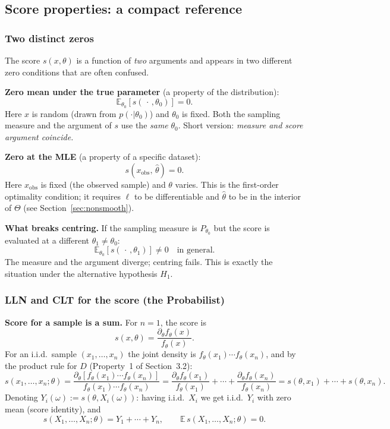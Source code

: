 \documentclass[a4paper,oneside,12pt]{extarticle}
\theoremstyle{plain}
\theoremstyle{definition}
\theoremstyle{remark}
\newcommand*{\E}{\mathbb{E}}
\begin{document}
\subsection{Score properties: a compact reference}
\label{sec:score_reference}

\subsubsection{Two distinct zeros}

The score $s(x,\theta)$ is a function of \emph{two} arguments and
appears in two different zero conditions that are often confused.

\textbf{Zero mean under the true parameter} (a property of the
distribution):
\[
  \E_{\theta_0}\!\left[s(\,\cdot\,,\theta_0)\right] = 0.
\]
Here $x$ is random (drawn from $p(\cdot|\theta_0)$) and
$\theta_0$ is fixed.  Both the sampling measure and the argument of
$s$ use the \emph{same} $\theta_0$.  Short version:
\emph{measure and score argument coincide.}

\textbf{Zero at the MLE} (a property of a specific dataset):
\[
  s(x_{\mathrm{obs}},\,\hat\theta) = 0.
\]
Here $x_{\mathrm{obs}}$ is fixed (the observed sample) and $\theta$
varies.  This is the first-order optimality condition; it requires
$\ell$ to be differentiable and $\hat\theta$ to be in the interior
of $\Theta$ (see Section~\ref{sec:nonsmooth}).

\textbf{What breaks centring.}
If the sampling measure is $P_{\theta_0}$ but the score is evaluated
at a different $\theta_1 \neq \theta_0$:
\[
  \E_{\theta_0}\!\left[s(\,\cdot\,,\theta_1)\right] \neq 0
  \quad \text{in general.}
\]
The measure and the argument diverge; centring fails.  This is
exactly the situation under the alternative hypothesis $H_1$.

\subsubsection{LLN and CLT for the score (the Probabilist)}

\noindent\textbf{Score for a sample is a sum.}
For $n=1$, the score is
\[
  s(x,\theta) = \frac{\partial_\theta f_\theta(x)}{f_\theta(x)}.
\]
For an i.i.d.\ sample $(x_1,\ldots,x_n)$ the joint density is
$f_\theta(x_1)\cdots f_\theta(x_n)$, and by the product rule for $D$
(Property~1 of Section~3.2):
\[
  s(x_1,\ldots,x_n;\theta)
  = \frac{\partial_\theta[f_\theta(x_1)\cdots f_\theta(x_n)]}
         {f_\theta(x_1)\cdots f_\theta(x_n)}
  = \frac{\partial_\theta f_\theta(x_1)}{f_\theta(x_1)}
    + \cdots +
    \frac{\partial_\theta f_\theta(x_n)}{f_\theta(x_n)}
  = s(\theta,x_1) + \cdots + s(\theta,x_n).
\]
Denoting $Y_i(\omega) := s(\theta, X_i(\omega))$: having i.i.d.\ $X_i$
we get i.i.d.\ $Y_i$ with zero mean (score identity), and
\[
  s(X_1,\ldots,X_n;\theta) = Y_1 + \cdots + Y_n,
  \qquad
  \E\,s(X_1,\ldots,X_n;\theta) = 0.
\]
\end{document}
